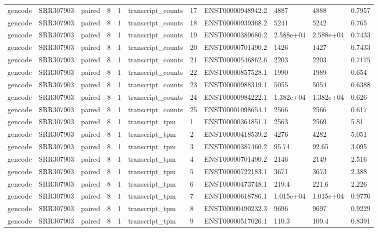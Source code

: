 \begin{tabular}{lllllllllll}
gencode & SRR307903 & paired & 8 & 1 & transcript\_counts & 17 & ENST00000948942.2 & 4887 & 4888 & 0.7957 \\
gencode & SRR307903 & paired & 8 & 1 & transcript\_counts & 18 & ENST00000939368.2 & 5241 & 5242 & 0.765 \\
gencode & SRR307903 & paired & 8 & 1 & transcript\_counts & 19 & ENST00000389680.2 & 2.588e+04 & 2.588e+04 & 0.7433 \\
gencode & SRR307903 & paired & 8 & 1 & transcript\_counts & 20 & ENST00000701490.2 & 1426 & 1427 & 0.7433 \\
gencode & SRR307903 & paired & 8 & 1 & transcript\_counts & 21 & ENST00000546862.6 & 2203 & 2203 & 0.7175 \\
gencode & SRR307903 & paired & 8 & 1 & transcript\_counts & 22 & ENST00000857528.1 & 1990 & 1989 & 0.654 \\
gencode & SRR307903 & paired & 8 & 1 & transcript\_counts & 23 & ENST00000988319.1 & 5055 & 5054 & 0.6388 \\
gencode & SRR307903 & paired & 8 & 1 & transcript\_counts & 24 & ENST00000984222.1 & 1.382e+04 & 1.382e+04 & 0.626 \\
gencode & SRR307903 & paired & 8 & 1 & transcript\_counts & 25 & ENST00001098654.1 & 2566 & 2566 & 0.617 \\
gencode & SRR307903 & paired & 8 & 1 & transcript\_tpm & 1 & ENST00000361851.1 & 2563 & 2569 & 5.81 \\
gencode & SRR307903 & paired & 8 & 1 & transcript\_tpm & 2 & ENST00000418539.2 & 4276 & 4282 & 5.051 \\
gencode & SRR307903 & paired & 8 & 1 & transcript\_tpm & 3 & ENST00000387460.2 & 95.74 & 92.65 & 3.095 \\
gencode & SRR307903 & paired & 8 & 1 & transcript\_tpm & 4 & ENST00000701490.2 & 2146 & 2149 & 2.516 \\
gencode & SRR307903 & paired & 8 & 1 & transcript\_tpm & 5 & ENST00000722183.1 & 3671 & 3673 & 2.388 \\
gencode & SRR307903 & paired & 8 & 1 & transcript\_tpm & 6 & ENST00000473748.1 & 219.4 & 221.6 & 2.226 \\
gencode & SRR307903 & paired & 8 & 1 & transcript\_tpm & 7 & ENST00000618786.1 & 1.015e+04 & 1.015e+04 & 0.9776 \\
gencode & SRR307903 & paired & 8 & 1 & transcript\_tpm & 8 & ENST00000490232.3 & 9696 & 9697 & 0.9229 \\
gencode & SRR307903 & paired & 8 & 1 & transcript\_tpm & 9 & ENST00000517026.1 & 110.3 & 109.4 & 0.8391 \\

\end{tabular}
